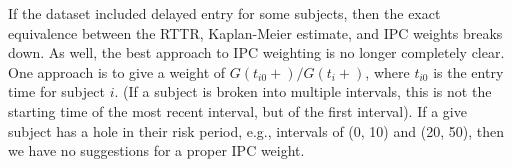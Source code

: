 \documentclass{article}\usepackage[]{graphicx}\usepackage[]{xcolor}
\begin{document}
If the dataset included delayed entry for some subjects, then the exact 
equivalence between the RTTR, Kaplan-Meier estimate, and IPC weights breaks
down.  As well, the best approach to IPC weighting is no longer completely
clear.  One approach is to give a weight of $G(t_{i0}+)/G(t_i+)$, where 
$t_{i0}$ is the entry time for subject $i$.  
(If a subject is broken into multiple intervals, this is not the starting
time of the most recent interval, but of the first interval).
If a give subject has a hole in their risk period, e.g., intervals of
(0, 10) and (20, 50), then we have no suggestions for a proper IPC weight.



\end{document}
